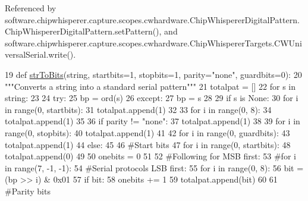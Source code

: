 Referenced by software.\+chipwhisperer.\+capture.\+scopes.\+cwhardware.\+Chip\+Whisperer\+Digital\+Pattern.\+Chip\+Whisperer\+Digital\+Pattern.\+set\+Pattern(), and software.\+chipwhisperer.\+capture.\+scopes.\+cwhardware.\+Chip\+Whisperer\+Targets.\+C\+W\+Universal\+Serial.\+write().


\begin{DoxyCode}
19 \textcolor{keyword}{def }\hyperlink{namespacesoftware_1_1chipwhisperer_1_1capture_1_1utils_1_1SerialProtocols_ae026398d5953835633fdc1631d7847a8}{strToBits}(string, startbits=1, stopbits=1, parity="none", guardbits=0):
20     \textcolor{stringliteral}{"""Converts a string into a standard serial pattern"""}
21     totalpat = []
22     \textcolor{keywordflow}{for} s \textcolor{keywordflow}{in} string:
23         
24         \textcolor{keywordflow}{try}:        
25             bp = ord(s)
26         \textcolor{keywordflow}{except}:
27             bp = s
28             
29         \textcolor{keywordflow}{if} s \textcolor{keywordflow}{is} \textcolor{keywordtype}{None}:
30             \textcolor{keywordflow}{for} i \textcolor{keywordflow}{in} range(0, startbits):
31                 totalpat.append(1)
32                 
33             \textcolor{keywordflow}{for} i \textcolor{keywordflow}{in} range(0, 8):
34                 totalpat.append(1)
35                 
36             \textcolor{keywordflow}{if} parity != \textcolor{stringliteral}{"none"}:
37                 totalpat.append(1)
38                 
39             \textcolor{keywordflow}{for} i \textcolor{keywordflow}{in} range(0, stopbits):
40                 totalpat.append(1)
41                 
42             \textcolor{keywordflow}{for} i \textcolor{keywordflow}{in} range(0, guardbits):
43                 totalpat.append(1)
44         \textcolor{keywordflow}{else}:
45                 
46             \textcolor{comment}{#Start bits}
47             \textcolor{keywordflow}{for} i \textcolor{keywordflow}{in} range(0, startbits):
48                 totalpat.append(0)
49              
50             onebits = 0
51              
52             \textcolor{comment}{#Following for MSB first:   }
53             \textcolor{comment}{#for i in range(7, -1, -1):}
54             \textcolor{comment}{#Serial protocols LSB first:}
55             \textcolor{keywordflow}{for} i \textcolor{keywordflow}{in} range(0,  8):
56                 bit = (bp >> i) & 0x01
57                 \textcolor{keywordflow}{if} bit:
58                     onebits += 1
59                 totalpat.append(bit)
60     
61             \textcolor{comment}{#Parity bits}

\end{DoxyCode}
